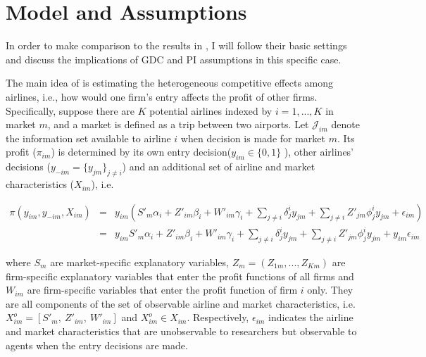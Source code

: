 \documentclass[draft]{article}
\begin{document}
\bigskip


\section{Model and Assumptions}

In order to make comparison to the results in \cite{ciliberto2009market}, I will follow their basic settings and discuss the implications of GDC and PI assumptions in this specific 
case.

The main idea of \cite{ciliberto2009market} is estimating the heterogeneous competitive effects among airlines, i.e., how would one firm's entry affects the profit of other firms. Specifically, suppose there are $K$ potential airlines indexed by $i=1,...,K$ in market $m$, and a market is defined as a trip between two airports. Let $\mathcal{J}_{im}$ denote the information set available to airline $i$ when decision is made for market $m$. Its profit ($\pi_{im}$) is determined by its own entry decision($y_{im} \in \{0,1\}$ ), other airlines' decisions ($y_{-im}=\{y_{jm}\}_{j \neq i}$) and an additional set of airline and market characteristics ($X_{im}$), i.e. 



\begin{eqnarray}
\pi(y_{im},y_{-im},X_{im})&=& y_{im}(S'_m\alpha_i+Z'_{im}\beta_i+W'_{im}\gamma_i+\sum_{j\neq i}\delta_{j}^i y_{jm}+\sum_{j\neq i}Z'_{jm}\phi_j^iy_{jm}+\epsilon_{im}) \nonumber \\
&=& y_{im}S'_m\alpha_i+Z'_{im}\beta_i+W'_{im}\gamma_i+\sum_{j\neq i}\delta_{j}^i y_{jm}+\sum_{j\neq i}Z'_{jm}\phi_j^iy_{jm} + y_{im} \epsilon_{im}
\label{profit}
\end{eqnarray}

 where $S_m$ are market-specific explanatory variables, $Z_{m}=(Z_{1m},...,Z_{Km})$ are firm-specific explanatory variables that enter the profit functions of all firms and $W_{im}$ are firm-specific variables that enter the profit function of firm $i$ only. They are all components of the set of observable airline and market characteristics, i.e.
$X^o_{im}=[S'_m, \ Z'_{im}, \ W'_{im}]$ and $X^o_{im} \in X_{im}$. Respectively, $\epsilon_{im}$ indicates the airline and market characteristics that are unobservable to researchers but observable to agents when the entry decisions are made. 


 
\end{document}
